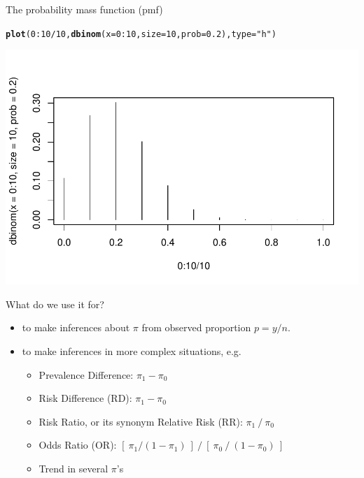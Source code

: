 \documentclass[10pt]{beamer}\usepackage[]{graphicx}\usepackage[]{color}
\makeatletter
\def\maxwidth{ %
  \ifdim\Gin@nat@width>\linewidth
    \linewidth
  \else
    \Gin@nat@width
  \fi
}
\newcommand{\hlnum}[1]{\textcolor[rgb]{0.686,0.059,0.569}{#1}}%
\newcommand{\hlstr}[1]{\textcolor[rgb]{0.192,0.494,0.8}{#1}}%
\newcommand{\hlopt}[1]{\textcolor[rgb]{0,0,0}{#1}}%
\newcommand{\hlstd}[1]{\textcolor[rgb]{0.345,0.345,0.345}{#1}}%
\newcommand{\hlkwc}[1]{\textcolor[rgb]{0.333,0.667,0.333}{#1}}%
\newcommand{\hlkwd}[1]{\textcolor[rgb]{0.737,0.353,0.396}{\textbf{#1}}}%
\newenvironment{kframe}{%
 \def\at@end@of@kframe{}%
 \ifinner\ifhmode%
  \def\at@end@of@kframe{\end{minipage}}%
  \begin{minipage}{\columnwidth}%
 \fi\fi%
 \def\FrameCommand##1{\hskip\@totalleftmargin \hskip-\fboxsep
 \colorbox{shadecolor}{##1}\hskip-\fboxsep
     \hskip-\linewidth \hskip-\@totalleftmargin \hskip\columnwidth}%
 \MakeFramed {\advance\hsize-\width
   \@totalleftmargin\z@ \linewidth\hsize
   \@setminipage}}%
 {\par\unskip\endMakeFramed%
 \at@end@of@kframe}
\newenvironment{knitrout}{}{} %
\makeatother
\begin{document}
\begin{frame}[fragile]{The probability mass function (pmf)}
	
\begin{knitrout}\tiny
{}\color{fgcolor}\begin{kframe}
\begin{alltt}
\hlkwd{plot}\hlstd{(}\hlnum{0}\hlopt{:}\hlnum{10}\hlopt{/}\hlnum{10}\hlstd{,} \hlkwd{dbinom}\hlstd{(}\hlkwc{x} \hlstd{=} \hlnum{0}\hlopt{:}\hlnum{10}\hlstd{,} \hlkwc{size} \hlstd{=} \hlnum{10}\hlstd{,} \hlkwc{prob} \hlstd{=} \hlnum{0.2}\hlstd{),} \hlkwc{type} \hlstd{=} \hlstr{"h"}\hlstd{)}
\end{alltt}
\end{kframe}

{\centering \includegraphics[width=\maxwidth]{figure/unnamed-chunk-5-1} 

}


\end{knitrout}
\end{frame}

\begin{frame}[fragile]{What do we use it for?}
	\small
	\begin{itemize}
		\setlength\itemsep{0.7em}
		\item to make inferences about $\pi$ from  observed  proportion $p= y/n.$ \pause 
		\item to make inferences in more complex situations, e.g. 
		\begin{itemize}
			\setlength\itemsep{0.4em}
			\item Prevalence Difference: $\pi _{1} - \pi _{0}$
			\item Risk Difference (RD): $\pi _{1} - \pi _{0}$
			\item Risk Ratio, or its synonym Relative Risk (RR): $\pi _{1}\:/\:\pi _{0}$
			\item Odds Ratio (OR): $[\: \pi _{1}/(1-\pi _{1})\:] \: / \: [\: \pi _{0}\: / \: (1-\pi _{0}) \: ]$
			\item Trend in several $\pi $'s
		\end{itemize}
	\end{itemize}
\end{frame}
\end{document}

